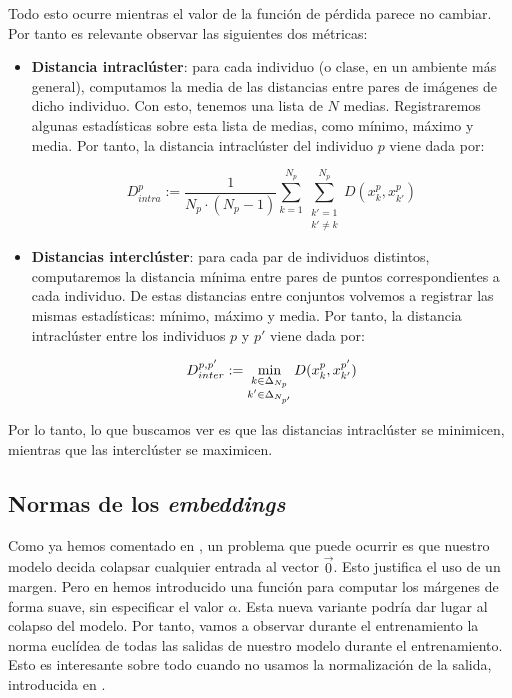 Todo esto ocurre mientras el valor de la función de pérdida parece no cambiar. Por tanto es relevante observar las siguientes dos métricas:

\begin{itemize}
    \item \textbf{Distancia intraclúster}: para cada individuo (o clase, en un ambiente más general), computamos la media de las distancias entre pares de imágenes de dicho individuo. Con esto, tenemos una lista de $N$ medias. Registraremos algunas estadísticas sobre esta lista de medias, como mínimo, máximo y media. Por tanto, la distancia intraclúster del individuo $p$ viene dada por:

    \begin{equation}
        D_{intra}^p := \frac{1}{N_p \cdot (N_p - 1)} \sum_{k = 1}^{N_p} \sum_{\substack{k' = 1 \\ k' \neq k}}^{N_p} D(x_k^p, x_{k'}^p)
    \end{equation}

    \item \textbf{Distancias interclúster}: para cada par de individuos distintos, computaremos la distancia mínima entre pares de puntos correspondientes a cada individuo. De estas distancias entre conjuntos volvemos a registrar las mismas estadísticas: mínimo, máximo y media. Por tanto, la distancia intraclúster entre los individuos $p$ y $p'$ viene dada por:

    \begin{equation}
        D_{inter}^{p, p'} := \min_{\substack{k \in \Delta_{N_p} \\ k' \in \Delta_{N_{p'}}}}{D(x_k^p, x_{k'}^{p'})}
    \end{equation}
\end{itemize}

Por lo tanto, lo que buscamos ver es que las distancias intraclúster se minimicen, mientras que las interclúster se maximicen.

\subsection{Normas de los \textit{embeddings}} \label{isubs:normas_embeddings}

Como ya hemos comentado en , un problema que puede ocurrir es que nuestro modelo decida colapsar cualquier entrada al vector $\vec{0}$. Esto justifica el uso de un margen. Pero en  hemos introducido una función para computar los márgenes de forma suave, sin especificar el valor $\alpha$. Esta nueva variante podría dar lugar al colapso del modelo. Por tanto, vamos a observar durante el entrenamiento la norma euclídea de todas las salidas de nuestro modelo durante el entrenamiento. Esto es interesante sobre todo cuando no usamos la normalización de la salida, introducida en .

